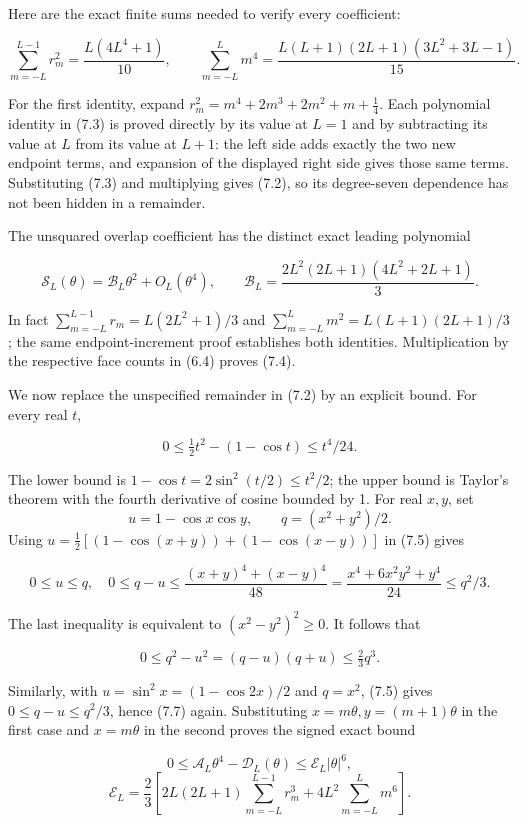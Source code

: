 \documentclass[
  11pt,
]{article}
\begin{document}
Here are the exact finite sums needed to verify every coefficient:

\[
\sum_{m=-L}^{L-1}r_m^2=\frac{L(4L^4+1)}{10},\qquad
\sum_{m=-L}^{L}m^4
=\frac{L(L+1)(2L+1)(3L^2+3L-1)}{15}.
\tag{7.3}
\]

For the first identity, expand \(r_m^2=m^4+2m^3+2m^2+m+\tfrac14\). Each
polynomial identity in (7.3) is proved directly by its value at \(L=1\)
and by subtracting its value at \(L\) from its value at \(L+1\): the
left side adds exactly the two new endpoint terms, and expansion of the
displayed right side gives those same terms. Substituting (7.3) and
multiplying gives (7.2), so its degree-seven dependence has not been
hidden in a remainder.

The unsquared overlap coefficient has the distinct exact leading
polynomial

\[
\mathcal S_L(\theta)=\mathcal B_L\theta^2+O_L(\theta^4),\qquad
\mathcal B_L=\frac{2L^2(2L+1)(4L^2+2L+1)}3.
\tag{7.4}
\]

In fact \(\sum_{m=-L}^{L-1}r_m=L(2L^2+1)/3\) and
\(\sum_{m=-L}^{L}m^2=L(L+1)(2L+1)/3\); the same endpoint-increment proof
establishes both identities. Multiplication by the respective face
counts in (6.4) proves (7.4).

We now replace the unspecified remainder in (7.2) by an explicit bound.
For every real \(t\),

\[
0\le\tfrac12t^2-(1-\cos t)\le t^4/24.
\tag{7.5}
\]

The lower bound is \(1-\cos t=2\sin^2(t/2)\le t^2/2\); the upper bound
is Taylor's theorem with the fourth derivative of cosine bounded by 1.
For real \(x,y\), set \[
u=1-\cos x\cos y,\qquad q=(x^2+y^2)/2.
\] Using \(u=\tfrac12[(1-\cos(x+y))+(1-\cos(x-y))]\) in (7.5) gives

\[
0\le u\le q,\quad
0\le q-u\le\frac{(x+y)^4+(x-y)^4}{48}
=\frac{x^4+6x^2y^2+y^4}{24}\le q^2/3.
\tag{7.6}
\]

The last inequality is equivalent to \((x^2-y^2)^2\ge0\). It follows
that

\[
0\le q^2-u^2=(q-u)(q+u)\le\tfrac23q^3.
\tag{7.7}
\]

Similarly, with \(u=\sin^2x=(1-\cos2x)/2\) and \(q=x^2\), (7.5) gives
\(0\le q-u\le q^2/3\), hence (7.7) again. Substituting
\(x=m\theta,y=(m+1)\theta\) in the first case and \(x=m\theta\) in the
second proves the signed exact bound

\[
\boxed{0\le\mathcal A_L\theta^4-\mathcal D_L(\theta)
\le\mathcal E_L|\theta|^6,}
\] \[
\mathcal E_L=\frac23\left[
2L(2L+1)\sum_{m=-L}^{L-1}r_m^3+
4L^2\sum_{m=-L}^{L}m^6\right].
\tag{7.8}
\]
\end{document}
